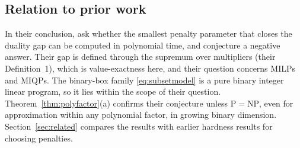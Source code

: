 \subsection{Relation to prior work}
In their conclusion, \citet{LefebvreSchmidt2025} ask whether the smallest
penalty parameter that closes the duality gap can be computed in
polynomial time, and conjecture a negative answer. Their gap is defined
through the supremum over multipliers (their Definition~1), which is
value-exactness here, and their question concerns MILPs and MIQPs. The
binary-box family \eqref{eq:subsetmodel} is a pure binary integer linear
program, so it lies within the scope of their question.
Theorem~\ref{thm:polyfactor}(a) confirms their conjecture unless
$\mathrm P=\mathrm{NP}$, even for approximation within any polynomial
factor, in growing binary dimension. Section~\ref{sec:related} compares
the results with earlier hardness results for choosing penalties.
